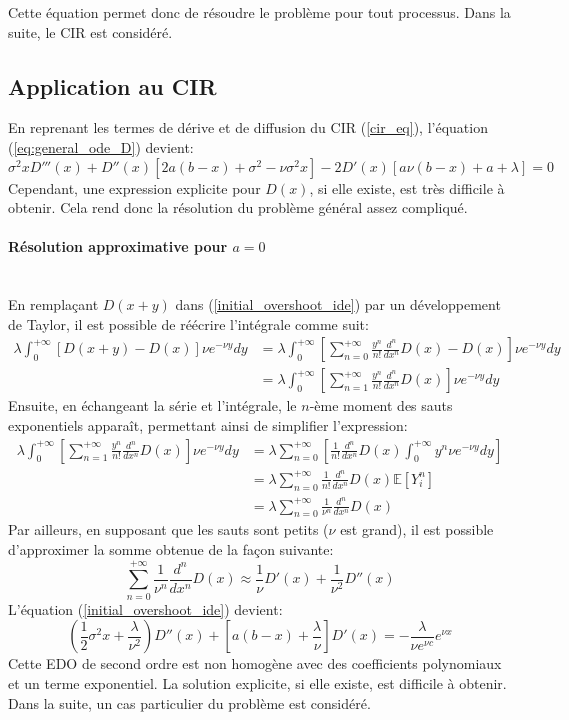 Cette équation permet donc de résoudre le problème pour tout processus. Dans la suite, le \acs{CIR} est considéré.
\subsection{Application au CIR}
En reprenant les termes de dérive et de diffusion du \acs{CIR} (\ref{cir_eq}), l'équation (\ref{eq:general_ode_D}) devient:
\[
\sigma ^2 x D'''(x)+D''(x) \left[2 a (b-x)+\sigma ^2-\nu  \sigma ^2x\right]-2 D'(x) [a \nu  (b-x)+a+\lambda ]=0
\]
Cependant, une expression explicite pour $D(x)$, si elle existe, est très difficile à obtenir. Cela rend donc la résolution du problème général assez compliqué. 
\paragraph{Résolution approximative pour $a=0$}\phantom{}\\
En remplaçant $D(x+y)$ dans (\ref{initial_overshoot_ide}) par un développement de Taylor, il est possible de réécrire l'intégrale comme suit:
\[
\begin{aligned}
    \lambda\int_0^{+\infty}\left[D(x+y)-D(x)\right]\nu e^{-\nu y}dy&=\lambda\int_0^{+\infty}\left[\sum_{n=0}^{+\infty}\frac{y^n}{n!}\frac{d^n}{dx^n}D(x)-D(x)\right]\nu e^{-\nu y}dy\\
    &=\lambda\int_0^{+\infty}\left[\sum_{n=1}^{+\infty}\frac{y^n}{n!}\frac{d^n}{dx^n}D(x)\right]\nu e^{-\nu y}dy
\end{aligned}
\]
Ensuite, en échangeant la série et l'intégrale, le $n$-ème moment des sauts exponentiels apparaît, permettant ainsi de simplifier l'expression:
\[
\begin{aligned}
    \lambda\int_0^{+\infty}\left[\sum_{n=1}^{+\infty}\frac{y^n}{n!}\frac{d^n}{dx^n}D(x)\right]\nu e^{-\nu y}dy&=\lambda\sum_{n=0}^{+\infty}\left[\frac{1}{n!}\frac{d^n}{dx^n}D(x)\int_0^{+\infty}y^n\nu e^{-\nu y}dy\right]\\
    &=\lambda\sum_{n=0}^{+\infty}\frac{1}{n!}\frac{d^n}{dx^n}D(x)\mathds{E}\left[Y_i^n\right]\\
    &=\lambda\sum_{n=0}^{+\infty}\frac{1}{\nu^n}\frac{d^n}{dx^n}D(x)
\end{aligned}
\]
Par ailleurs, en supposant que les sauts sont petits ($\nu$ est grand), il est possible d'approximer la somme obtenue de la façon suivante:
\[
\sum_{n=0}^{+\infty}\frac{1}{\nu^n}\frac{d^n}{dx^n}D(x)\approx\frac{1}{\nu}D'(x)+\frac{1}{\nu^2}D''(x)
\]
L'équation (\ref{initial_overshoot_ide}) devient:
\begin{equation}\label{final_overshoot_ode}
    \left(\frac{1}{2}\sigma^2x+\frac{\lambda}{\nu^2}\right)D''(x)+\left[a(b-x)+\frac{\lambda}{\nu}\right]D'(x) =-\frac{\lambda}{\nu e^{\nu c}}e^{\nu x}
\end{equation}
Cette \acs{EDO} de second ordre est non homogène avec des coefficients polynomiaux et un terme exponentiel. La solution explicite, si elle existe, est difficile à obtenir. Dans la suite, un cas particulier du problème est considéré.

